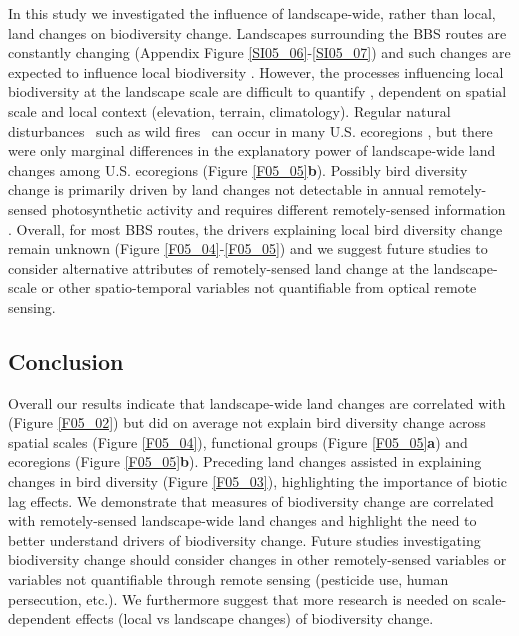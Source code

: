 In this study we investigated the influence of landscape-wide, rather than local, land changes on biodiversity change. Landscapes surrounding the BBS routes are constantly changing (Appendix Figure \ref{SI05_06}-\ref{SI05_07}) and such changes are expected to influence local biodiversity \citep{Manning2009,Turner2015,Seppelt2016}. However, the processes influencing local biodiversity at the landscape scale are difficult to quantify \citep{Chase2003}, dependent on spatial scale \citep{Miguet2015} and local context (elevation, terrain, climatology). Regular natural disturbances \textendash\ such as wild fires \textendash\ can occur in many U.S. ecoregions \citep{Morgan2001}, but there were only marginal differences in the explanatory power of landscape-wide land changes among U.S. ecoregions (Figure \ref{F05_05}\textbf{b}). Possibly bird diversity change is primarily driven by land changes not detectable in annual remotely-sensed photosynthetic activity and requires different remotely-sensed information \citep{Zhu2014,Goetz2014}. Overall, for most BBS routes, the drivers explaining local bird diversity change remain unknown (Figure \ref{F05_04}-\ref{F05_05}) and we suggest future studies to consider alternative attributes of remotely-sensed land change at the landscape-scale \citep{Watson2014} or other spatio-temporal variables not quantifiable from optical remote sensing.

\subsection{Conclusion}
\label{C05_0404}

Overall our results indicate that landscape-wide land changes are correlated with (Figure \ref{F05_02}) but did on average not explain bird diversity change across spatial scales (Figure \ref{F05_04}), functional groups (Figure \ref{F05_05}\textbf{a}) and ecoregions (Figure \ref{F05_05}\textbf{b}). Preceding land changes assisted in explaining changes in bird diversity (Figure \ref{F05_03}), highlighting the importance of biotic lag effects. We demonstrate that measures of biodiversity change are correlated with remotely-sensed landscape-wide land changes and highlight the need to better understand drivers of biodiversity change. Future studies investigating biodiversity change should consider changes in other remotely-sensed variables or variables not quantifiable through remote sensing (\eg pesticide use, human persecution, etc.). We furthermore suggest that more research is needed on scale-dependent effects (local vs landscape changes) of biodiversity change. 

\clearpage
%

%  
